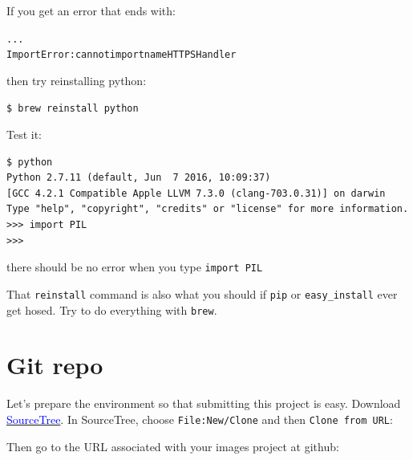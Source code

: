 \documentclass[titlepage]{tufte-book}
\begin{document}
\noindent If you get an error that ends with:

\begin{alltt}
    ...
    ImportError: cannot import name HTTPSHandler
\end{alltt}

\noindent then try reinstalling python:

\begin{lstlisting}[style=BashInputStyle]
$ brew reinstall python
\end{lstlisting}
\noindent Test it:

\begin{lstlisting}[style=BashInputStyle]
$ python
Python 2.7.11 (default, Jun  7 2016, 10:09:37) 
[GCC 4.2.1 Compatible Apple LLVM 7.3.0 (clang-703.0.31)] on darwin
Type "help", "copyright", "credits" or "license" for more information.
>>> import PIL
>>>
\end{lstlisting}

\noindent there should be no error when you type {\tt import PIL}

That {\tt reinstall} command is also what you should if {\tt pip} or {\tt easy\_install} ever get hosed. Try to do everything with {\tt brew}.

\section{Git repo}

Let's prepare the environment so that submitting this project is easy. Download \href{https://www.sourcetreeapp.com/download/}{\textcolor{blue}{SourceTree}}. In SourceTree, choose {\tt File:New/Clone} and then {\tt Clone from URL}:


\noindent Then go to the URL associated with your images project at github: 
\end{document}
